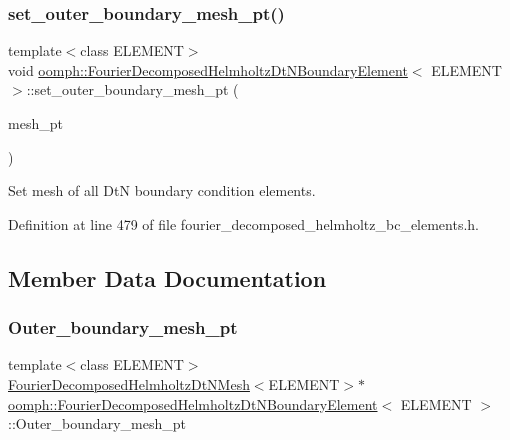 \subsubsection{\texorpdfstring{set\+\_\+outer\+\_\+boundary\+\_\+mesh\+\_\+pt()}{set\_outer\_boundary\_mesh\_pt()}}
{\footnotesize\ttfamily template$<$class E\+L\+E\+M\+E\+NT$>$ \\
void \hyperlink{classoomph_1_1FourierDecomposedHelmholtzDtNBoundaryElement}{oomph\+::\+Fourier\+Decomposed\+Helmholtz\+Dt\+N\+Boundary\+Element}$<$ E\+L\+E\+M\+E\+NT $>$\+::set\+\_\+outer\+\_\+boundary\+\_\+mesh\+\_\+pt (\begin{DoxyParamCaption}\item[{\hyperlink{classoomph_1_1FourierDecomposedHelmholtzDtNMesh}{Fourier\+Decomposed\+Helmholtz\+Dt\+N\+Mesh}$<$ E\+L\+E\+M\+E\+NT $>$ $\ast$}]{mesh\+\_\+pt }\end{DoxyParamCaption})\hspace{0.3cm}{\ttfamily [inline]}}



Set mesh of all DtN boundary condition elements. 



Definition at line 479 of file fourier\+\_\+decomposed\+\_\+helmholtz\+\_\+bc\+\_\+elements.\+h.



\subsection{Member Data Documentation}
\mbox{\label{classoomph_1_1FourierDecomposedHelmholtzDtNBoundaryElement_ab09f70cbb3ec70075e9c25fee1b67fbd}} 
\subsubsection{\texorpdfstring{Outer\+\_\+boundary\+\_\+mesh\+\_\+pt}{Outer\_boundary\_mesh\_pt}}
{\footnotesize\ttfamily template$<$class E\+L\+E\+M\+E\+NT$>$ \\
\hyperlink{classoomph_1_1FourierDecomposedHelmholtzDtNMesh}{Fourier\+Decomposed\+Helmholtz\+Dt\+N\+Mesh}$<$E\+L\+E\+M\+E\+NT$>$$\ast$ \hyperlink{classoomph_1_1FourierDecomposedHelmholtzDtNBoundaryElement}{oomph\+::\+Fourier\+Decomposed\+Helmholtz\+Dt\+N\+Boundary\+Element}$<$ E\+L\+E\+M\+E\+NT $>$\+::Outer\+\_\+boundary\+\_\+mesh\+\_\+pt\hspace{0.3cm}{\ttfamily [private]}}



